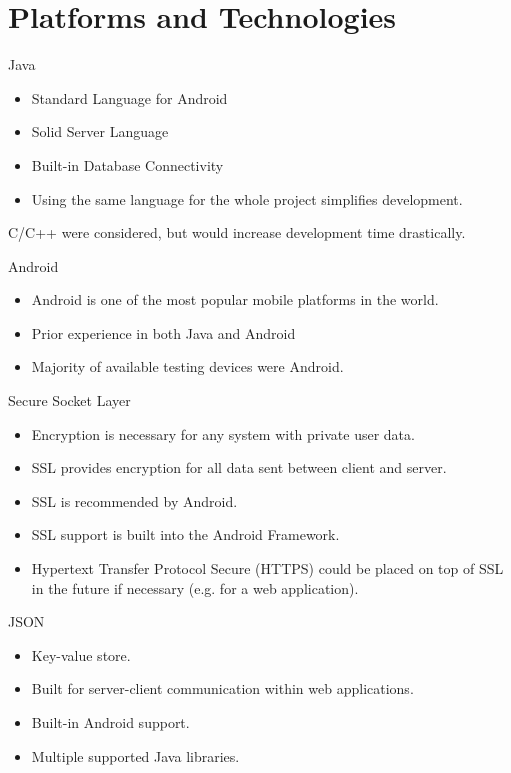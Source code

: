 \documentclass{beamer}
\begin{document}
\section{Platforms and Technologies}
\begin{frame}{Java}
\begin{itemize}
\item Standard Language for Android
\item Solid Server Language
\item Built-in Database Connectivity
\item Using the same language for the whole project simplifies development.
\end{itemize}
C/C++ were considered, but would increase development time drastically.
\end{frame}

\begin{frame}{Android}
\begin{itemize}
\item Android is one of the most popular mobile platforms in the world.
\item Prior experience in both Java and Android
\item Majority of available testing devices were Android.
\end{itemize}
\end{frame}

\begin{frame}{Secure Socket Layer}
\begin{itemize}
\item Encryption is necessary for any system with private user data.
\item SSL provides encryption for all data sent between client and server.
\item SSL is recommended by Android.
\item SSL support is built into the Android Framework.
\item Hypertext Transfer Protocol Secure (HTTPS) could be placed on top of SSL in the future if 
necessary (e.g. for a web application).
\end{itemize}
\end{frame}

\begin{frame}{JSON}
\begin{itemize}
\item Key-value store.
\item Built for server-client communication within web applications.
\item Built-in Android support.
\item Multiple supported Java libraries.
\end{itemize}
\end{frame}
\end{document}

